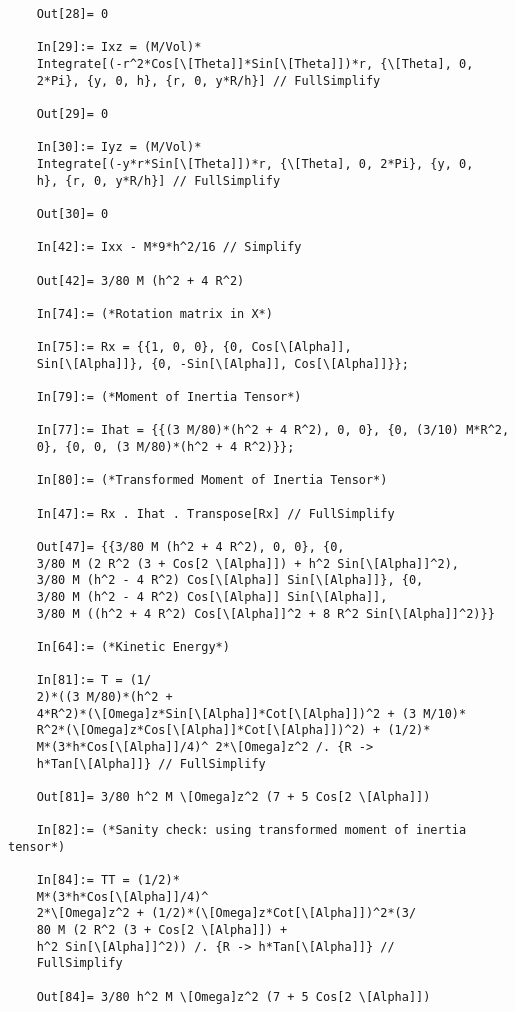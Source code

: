 \documentclass{article}
\theoremstyle{definition}
\begin{document}
\begin{enumerate}[label=(\alph*)]
\begin{lstlisting}
	Out[28]= 0
	
	In[29]:= Ixz = (M/Vol)*
	Integrate[(-r^2*Cos[\[Theta]]*Sin[\[Theta]])*r, {\[Theta], 0, 
	2*Pi}, {y, 0, h}, {r, 0, y*R/h}] // FullSimplify
	
	Out[29]= 0
	
	In[30]:= Iyz = (M/Vol)*
	Integrate[(-y*r*Sin[\[Theta]])*r, {\[Theta], 0, 2*Pi}, {y, 0, 
	h}, {r, 0, y*R/h}] // FullSimplify
	
	Out[30]= 0
	
	In[42]:= Ixx - M*9*h^2/16 // Simplify
	
	Out[42]= 3/80 M (h^2 + 4 R^2)
	
	In[74]:= (*Rotation matrix in X*)
	
	In[75]:= Rx = {{1, 0, 0}, {0, Cos[\[Alpha]], 
	Sin[\[Alpha]]}, {0, -Sin[\[Alpha]], Cos[\[Alpha]]}};
	
	In[79]:= (*Moment of Inertia Tensor*)
	
	In[77]:= Ihat = {{(3 M/80)*(h^2 + 4 R^2), 0, 0}, {0, (3/10) M*R^2, 
	0}, {0, 0, (3 M/80)*(h^2 + 4 R^2)}};
	
	In[80]:= (*Transformed Moment of Inertia Tensor*)
	
	In[47]:= Rx . Ihat . Transpose[Rx] // FullSimplify
	
	Out[47]= {{3/80 M (h^2 + 4 R^2), 0, 0}, {0, 
	3/80 M (2 R^2 (3 + Cos[2 \[Alpha]]) + h^2 Sin[\[Alpha]]^2), 
	3/80 M (h^2 - 4 R^2) Cos[\[Alpha]] Sin[\[Alpha]]}, {0, 
	3/80 M (h^2 - 4 R^2) Cos[\[Alpha]] Sin[\[Alpha]], 
	3/80 M ((h^2 + 4 R^2) Cos[\[Alpha]]^2 + 8 R^2 Sin[\[Alpha]]^2)}}
	
	In[64]:= (*Kinetic Energy*)
	
	In[81]:= T = (1/
	2)*((3 M/80)*(h^2 + 
	4*R^2)*(\[Omega]z*Sin[\[Alpha]]*Cot[\[Alpha]])^2 + (3 M/10)*
	R^2*(\[Omega]z*Cos[\[Alpha]]*Cot[\[Alpha]])^2) + (1/2)*
	M*(3*h*Cos[\[Alpha]]/4)^ 2*\[Omega]z^2 /. {R -> 
	h*Tan[\[Alpha]]} // FullSimplify
	
	Out[81]= 3/80 h^2 M \[Omega]z^2 (7 + 5 Cos[2 \[Alpha]])
	
	In[82]:= (*Sanity check: using transformed moment of inertia tensor*)
	
	In[84]:= TT = (1/2)*
	M*(3*h*Cos[\[Alpha]]/4)^ 
	2*\[Omega]z^2 + (1/2)*(\[Omega]z*Cot[\[Alpha]])^2*(3/
	80 M (2 R^2 (3 + Cos[2 \[Alpha]]) + 
	h^2 Sin[\[Alpha]]^2)) /. {R -> h*Tan[\[Alpha]]} // 
	FullSimplify
	
	Out[84]= 3/80 h^2 M \[Omega]z^2 (7 + 5 Cos[2 \[Alpha]])
	\end{lstlisting}
\end{enumerate}


	
\end{document}
